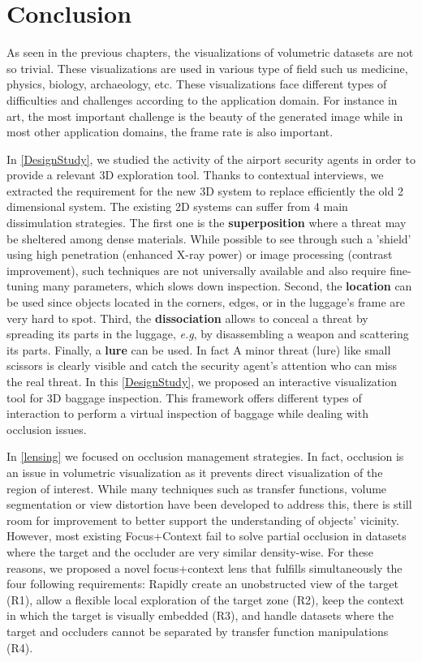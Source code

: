 \chapter{ Conclusion }
\label{Conclusion}

As seen in the previous chapters, the visualizations of volumetric datasets are not so trivial. These visualizations are used in various type of field such us medicine, physics, biology, archaeology, etc. These visualizations face different types of difficulties and challenges according to the application domain. For instance in art, the most important challenge is the beauty of the generated image while in most other application domains, the frame rate is also important.

 
In \autoref{DesignStudy}, we studied the activity of the airport security agents in order to provide a relevant 3D exploration tool. Thanks to contextual interviews, we extracted the requirement for the new 3D system  to replace efficiently  the old 2 dimensional system. The existing 2D systems can suffer from 4 main dissimulation strategies. The first one is the \textbf{superposition} where a threat may be sheltered among dense materials. While possible to see through such a 'shield' using high penetration (enhanced X-ray power) or image processing (contrast improvement), such techniques are not universally available and also require fine-tuning many parameters, which slows down inspection. Second, the \textbf{location} can be used since objects located in the corners, edges, or in the luggage's frame are very hard to spot. Third, the \textbf{dissociation} allows to conceal a threat by spreading its parts in the luggage, \emph{e.g}, by disassembling a weapon and scattering its parts. Finally, a \textbf{lure} can be used. In fact A minor threat (lure) like small scissors is clearly visible and catch the security agent's attention who can miss the real threat. In this \autoref{DesignStudy}, we proposed an interactive visualization tool for 3D baggage inspection. This framework offers different types of interaction to perform a virtual inspection of baggage while dealing with occlusion issues.



In \autoref{lensing} we focused on occlusion management strategies. In fact, occlusion is an issue in volumetric visualization as it prevents direct visualization of the region of interest. While many techniques such as transfer functions, volume segmentation or view distortion have been developed to address this, there is still room for improvement to better support the understanding of objects' vicinity. However, most existing Focus+Context fail to solve partial occlusion in datasets where the target and the occluder are very similar density-wise. For these reasons, we proposed a novel focus+context lens that fulfills simultaneously the four following requirements: Rapidly create an unobstructed view of the target (R1), allow a flexible local exploration of the target zone (R2), keep the context in which the target is visually embedded (R3), and handle datasets where the target and occluders cannot  be separated by transfer function manipulations (R4).



